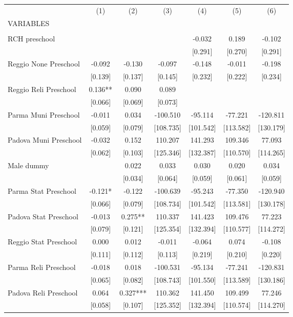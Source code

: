 \begin{tabular}{lcccccc} \hline
 & (1) & (2) & (3) & (4) & (5) & (6) \\
VARIABLES &  &  &  &  &  &  \\ \hline
 &  &  &  &  &  &  \\
RCH preschool &  &  &  & -0.032 & 0.189 & -0.102 \\
 &  &  &  & [0.291] & [0.270] & [0.291] \\
Reggio None Preschool & -0.092 & -0.130 & -0.097 & -0.148 & -0.011 & -0.198 \\
 & [0.139] & [0.137] & [0.145] & [0.232] & [0.222] & [0.234] \\
Reggio Reli Preschool & 0.136** & 0.090 & 0.089 &  &  &  \\
 & [0.066] & [0.069] & [0.073] &  &  &  \\
Parma Muni Preschool & -0.011 & 0.034 & -100.510 & -95.114 & -77.221 & -120.811 \\
 & [0.059] & [0.079] & [108.735] & [101.542] & [113.582] & [130.179] \\
Padova Muni Preschool & -0.032 & 0.152 & 110.207 & 141.293 & 109.346 & 77.093 \\
 & [0.062] & [0.103] & [125.346] & [132.387] & [110.570] & [114.265] \\
Male dummy &  & 0.022 & 0.033 & 0.030 & 0.020 & 0.034 \\
 &  & [0.034] & [0.064] & [0.059] & [0.061] & [0.059] \\
Parma Stat Preschool & -0.121* & -0.122 & -100.639 & -95.243 & -77.350 & -120.940 \\
 & [0.066] & [0.079] & [108.734] & [101.542] & [113.581] & [130.178] \\
Padova Stat Preschool & -0.013 & 0.275** & 110.337 & 141.423 & 109.476 & 77.223 \\
 & [0.079] & [0.121] & [125.354] & [132.394] & [110.577] & [114.272] \\
Reggio Stat Preschool & 0.000 & 0.012 & -0.011 & -0.064 & 0.074 & -0.108 \\
 & [0.111] & [0.112] & [0.113] & [0.219] & [0.210] & [0.220] \\
Parma Reli Preschool & -0.018 & 0.018 & -100.531 & -95.134 & -77.241 & -120.831 \\
 & [0.065] & [0.082] & [108.743] & [101.550] & [113.589] & [130.186] \\
Padova Reli Preschool & 0.064 & 0.327*** & 110.362 & 141.450 & 109.499 & 77.246 \\
 & [0.058] & [0.107] & [125.352] & [132.394] & [110.574] & [114.270] \\

\end{tabular}
